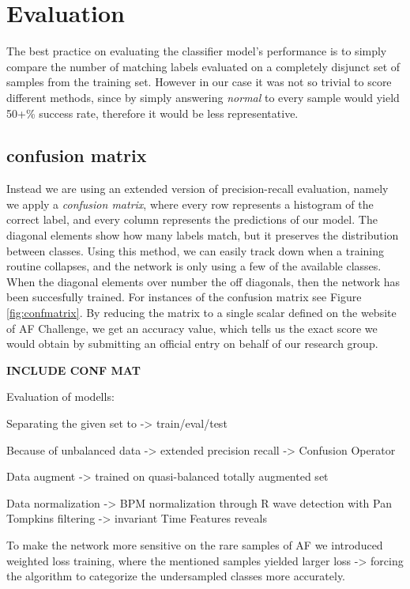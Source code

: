 \chapter{Evaluation}

The best practice on evaluating the classifier model's performance is to simply compare the number of matching labels evaluated on a completely disjunct set of samples from the training set.
However in our case it was not so trivial to score different methods, since by simply answering \textit{normal} to every sample would yield 50+\% success rate, therefore it would be less representative.

\section{confusion matrix}
Instead we are using an extended version of precision-recall evaluation, namely we apply a \textit{confusion matrix}, where every row represents a histogram of the correct label, and every column represents the predictions of our model. The diagonal elements show how many labels match, but it preserves the distribution between classes.
Using this method, we can easily track down when a training routine collapses, and the network is only using a few of the available classes. When the diagonal elements over number the off diagonals, then the network has been succesfully trained. For instances of the confusion matrix see Figure \ref{fig:confmatrix}.
By reducing the matrix to a single scalar defined on the website of AF Challenge, we get an accuracy value, which tells us the exact score we would obtain by submitting an official entry on behalf of our research group.

\textbf{INCLUDE CONF MAT}

Evaluation of modells:

Separating the given set to -> train/eval/test

Because of unbalanced data -> extended precision recall -> Confusion Operator

Data augment -> trained on quasi-balanced totally augmented set

Data normalization -> BPM normalization through R wave detection with Pan Tompkins filtering -> invariant Time Features reveals

To make the network more sensitive on the rare samples of AF we introduced weighted loss training, where the mentioned samples yielded larger loss -> forcing the algorithm to categorize the undersampled classes more accurately.
